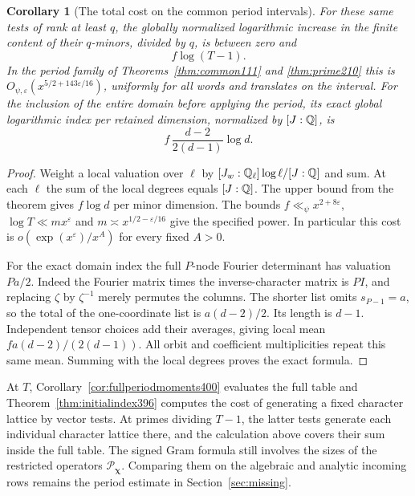 \documentclass[a4paper,11pt]{article}
\newtheorem{corollary}[proposition]{Corollary}
\theoremstyle{definition}
\theoremstyle{remark}
\numberwithin{equation}{section}
\begin{document}
\begin{corollary}[The total cost on the common period intervals]\leavevmode
\label{cor:jointscalarbudget432}
For these same tests of rank at least \(q\), the globally
normalized logarithmic increase in the finite content of their
\(q\)-minors, divided by \(q\), is between zero and
\[
                     f\log(T-1).
\]
In the period family of Theorems~\ref{thm:common111} and
\ref{thm:prime210} this is
\(O_{\psi,\varepsilon}(x^{5/2+143\varepsilon/16})\),
uniformly for all words and translates on the interval.
For the inclusion of the entire domain before applying the
period, its exact global logarithmic index per retained
dimension, normalized by \([J:\mathbb Q]\), is
\[
             f\,\frac{d-2}{2(d-1)}\log d .
\]
\end{corollary}
\begin{proof}
Weight a local valuation over \(\ell\) by
\([J_w:\mathbb Q_\ell]\log\ell/[J:\mathbb Q]\) and sum. At each
\(\ell\) the sum of the local degrees equals \([J:\mathbb Q]\).
The upper bound from the theorem gives \(f\log d\) per
minor dimension. The bounds \(f\ll_\psi x^{2+8\varepsilon}\),
\(\log T\ll m x^\varepsilon\) and
\(m\asymp x^{1/2-\varepsilon/16}\) give the specified power.
In particular this cost is \(o(\exp(x^\varepsilon)/x^A)\)
for every fixed \(A>0\).

For the exact domain index the full \(P\)-node Fourier
determinant has valuation \(Pa/2\). Indeed the Fourier matrix
times the inverse-character matrix is \(P I\), and replacing
\(\zeta\) by \(\zeta^{-1}\) merely permutes the columns.
The shorter list omits \(s_{P-1}=a\), so the total of the
one-coordinate list is \(a(d-2)/2\). Its length is \(d-1\).
Independent tensor choices add their averages, giving local
mean \(fa(d-2)/(2(d-1))\). All orbit and coefficient
multiplicities repeat this same mean. Summing with the local
degrees proves the exact formula.
\end{proof}

At \(T\), Corollary~\ref{cor:fullperiodmoments400} evaluates the
full table and Theorem~\ref{thm:initialindex396} computes the
cost of generating a fixed character lattice by vector tests.
At primes dividing \(T-1\), the latter tests generate each
individual character lattice there, and the calculation above
covers their sum inside the full table. The signed Gram formula
still involves the sizes of the restricted operators
\(\mathcal P_{\boldsymbol\chi}\). Comparing them on the
algebraic and analytic incoming rows remains the period
estimate in Section~\ref{sec:missing}.
\end{document}
